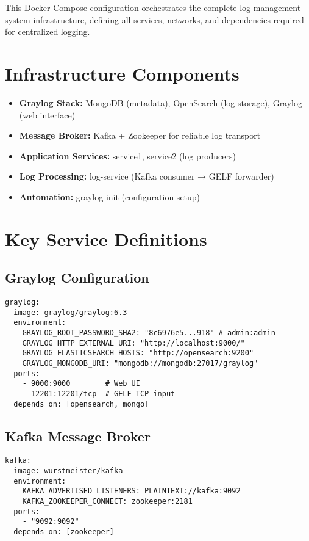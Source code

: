 \documentclass[12pt,a4paper]{report}
\begin{document}
This Docker Compose configuration orchestrates the complete log management system infrastructure, defining all services, networks, and dependencies required for centralized logging.

\section*{Infrastructure Components}

\begin{itemize}
\item \textbf{Graylog Stack:} MongoDB (metadata), OpenSearch (log storage), Graylog (web interface)
\item \textbf{Message Broker:} Kafka + Zookeeper for reliable log transport
\item \textbf{Application Services:} service1, service2 (log producers)
\item \textbf{Log Processing:} log-service (Kafka consumer → GELF forwarder)
\item \textbf{Automation:} graylog-init (configuration setup)
\end{itemize}

\section*{Key Service Definitions}

\subsection*{Graylog Configuration}
\begin{Verbatim}[frame=single, fontsize=\scriptsize]
graylog:
  image: graylog/graylog:6.3
  environment:
    GRAYLOG_ROOT_PASSWORD_SHA2: "8c6976e5...918" # admin:admin
    GRAYLOG_HTTP_EXTERNAL_URI: "http://localhost:9000/"
    GRAYLOG_ELASTICSEARCH_HOSTS: "http://opensearch:9200"
    GRAYLOG_MONGODB_URI: "mongodb://mongodb:27017/graylog"
  ports:
    - 9000:9000        # Web UI
    - 12201:12201/tcp  # GELF TCP input
  depends_on: [opensearch, mongo]
\end{Verbatim}

\subsection*{Kafka Message Broker}
\begin{Verbatim}[frame=single, fontsize=\scriptsize]
kafka:
  image: wurstmeister/kafka
  environment:
    KAFKA_ADVERTISED_LISTENERS: PLAINTEXT://kafka:9092
    KAFKA_ZOOKEEPER_CONNECT: zookeeper:2181
  ports:
    - "9092:9092"
  depends_on: [zookeeper]
\end{Verbatim}
\end{document}
